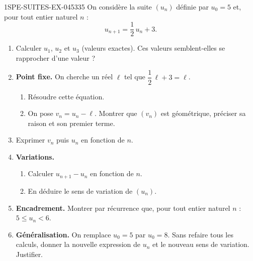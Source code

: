 \begin{exercice}{1SPE-SUITES-EX-045}{3}{35}
On considère la suite $(u_n)$ définie par $u_0 = 5$ et, pour tout entier naturel $n$ :
\[
  u_{n+1} = \frac{1}{2}\,u_n + 3.
\]

\begin{enumerate}
  \item Calculer $u_1$, $u_2$ et $u_3$ (valeurs exactes). Ces valeurs semblent-elles se rapprocher d'une valeur ?

  \item \textbf{Point fixe.} On cherche un réel $\ell$ tel que $\dfrac{1}{2}\,\ell + 3 = \ell$.
  \begin{enumerate}
    \item Résoudre cette équation.
    \item On pose $v_n = u_n - \ell$. Montrer que $(v_n)$ est géométrique, préciser sa raison et son premier terme.
  \end{enumerate}

  \item Exprimer $v_n$ puis $u_n$ en fonction de $n$.

  \item \textbf{Variations.}
  \begin{enumerate}
    \item Calculer $u_{n+1} - u_n$ en fonction de $n$.
    \item En déduire le sens de variation de $(u_n)$.
  \end{enumerate}

  \item \textbf{Encadrement.} Montrer par récurrence que, pour tout entier naturel $n$ : $5 \leq u_n < 6$.

  \item \textbf{Généralisation.} On remplace $u_0 = 5$ par $u_0 = 8$. Sans refaire tous les calculs, donner la nouvelle expression de $u_n$ et le nouveau sens de variation. Justifier.
\end{enumerate}
\end{exercice}
